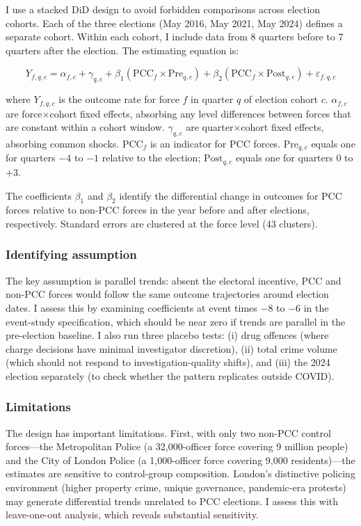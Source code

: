 \documentclass[12pt]{article}
\begin{document}
I use a stacked DiD design \citep{cengiz2019effect, callaway2021difference} to avoid forbidden comparisons across election cohorts. Each of the three elections (May 2016, May 2021, May 2024) defines a separate cohort. Within each cohort, I include data from 8 quarters before to 7 quarters after the election. The estimating equation is:

\begin{equation}
Y_{f,q,c} = \alpha_{f,c} + \gamma_{q,c} + \beta_1 (\text{PCC}_f \times \text{Pre}_{q,c}) + \beta_2 (\text{PCC}_f \times \text{Post}_{q,c}) + \varepsilon_{f,q,c}
\label{eq:main}
\end{equation}

\noindent where $Y_{f,q,c}$ is the outcome rate for force $f$ in quarter $q$ of election cohort $c$. $\alpha_{f,c}$ are force$\times$cohort fixed effects, absorbing any level differences between forces that are constant within a cohort window. $\gamma_{q,c}$ are quarter$\times$cohort fixed effects, absorbing common shocks. $\text{PCC}_f$ is an indicator for PCC forces. $\text{Pre}_{q,c}$ equals one for quarters $-4$ to $-1$ relative to the election; $\text{Post}_{q,c}$ equals one for quarters $0$ to $+3$.

The coefficients $\beta_1$ and $\beta_2$ identify the differential change in outcomes for PCC forces relative to non-PCC forces in the year before and after elections, respectively. Standard errors are clustered at the force level (43 clusters).

\subsubsection*{Identifying assumption} The key assumption is parallel trends: absent the electoral incentive, PCC and non-PCC forces would follow the same outcome trajectories around election dates. I assess this by examining coefficients at event times $-8$ to $-6$ in the event-study specification, which should be near zero if trends are parallel in the pre-election baseline. I also run three placebo tests: (i) drug offences (where charge decisions have minimal investigator discretion), (ii) total crime volume (which should not respond to investigation-quality shifts), and (iii) the 2024 election separately (to check whether the pattern replicates outside COVID).

\subsubsection*{Limitations} The design has important limitations. First, with only two non-PCC control forces---the Metropolitan Police (a 32,000-officer force covering 9 million people) and the City of London Police (a 1,000-officer force covering 9,000 residents)---the estimates are sensitive to control-group composition. London's distinctive policing environment (higher property crime, unique governance, pandemic-era protests) may generate differential trends unrelated to PCC elections. I assess this with leave-one-out analysis, which reveals substantial sensitivity.
\end{document}
